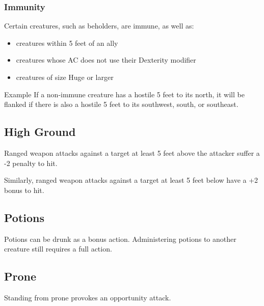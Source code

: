 \documentclass[House_Rules.tex]{subfiles}
\begin{document}
\subsubsection{Immunity}
Certain creatures, such as beholders, are immune, as well as:
\begin{itemize}
    \item creatures within 5 feet of an ally
    \item creatures whose AC does not use their Dexterity modifier
    \item creatures of size Huge or larger
\end{itemize}

\begin{DndComment}{Example}
If a non-immune creature has a hostile 5 feet to its north, it will be flanked if there is also a hostile 5 feet to its southwest, south, or southeast.
\end{DndComment}

\subsection{High Ground}
Ranged weapon attacks against a target at least 5 feet above the attacker suffer a -2 penalty to hit.

Similarly, ranged weapon attacks against a target at least 5 feet below have a +2 bonus to hit.

\subsection{Potions}

Potions can be drunk as a bonus action. Administering potions to another creature still requires a full action.

\subsection{Prone}
Standing from prone provokes an opportunity attack.
\end{document}

